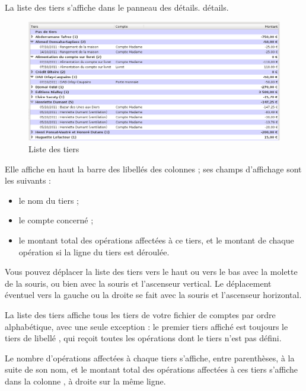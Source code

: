 La liste des tiers s'affiche dans le panneau des \ifIllustration détails.
\else détails.
\fi
\ifIllustration
\begin{figure}[htbp]
\begin{center}
\includegraphics[scale=0.5]{image/screenshot/thirdparties_list}
\end{center}
\caption{Liste des tiers}
\label{thirdparties-list-img}
\end{figure}
\fi

Elle affiche en haut la barre des libellés des colonnes ; ses champs d'affichage sont les suivants :
\begin{itemize}
	 \item le nom du tiers ;
	 \item le compte concerné ;
	 \item le montant total des opérations affectées à ce tiers, et le montant de chaque opération si la ligne du tiers est déroulée.
\end{itemize}

Vous pouvez déplacer la liste des tiers vers le haut ou vers le bas avec la molette de la souris, ou bien avec la souris et l'ascenseur vertical. Le déplacement éventuel vers la gauche ou la droite se fait avec la souris et l'ascenseur horizontal.

La liste des tiers affiche tous les tiers de votre fichier de comptes par ordre alphabétique, avec une seule exception : le premier tiers affiché est toujours le tiers de libellé , qui reçoit toutes les opérations dont le tiers n'est pas défini.


Le nombre d'opérations affectées à chaque tiers s'affiche, entre parenthèses, à la suite de son nom, et le montant total des opérations affectées à ces tiers s'affiche dans la colonne , à droite sur la même ligne.

